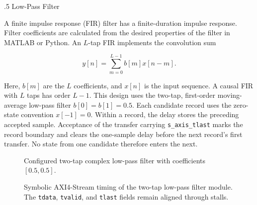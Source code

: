%
%
\smallskip
{}
.5  \quad Low-Pass Filter

A finite impulse response (FIR) filter has a finite-duration impulse response.  Filter coefficients are calculated from the desired properties of the filter in MATLAB or Python.  An $L$-tap FIR implements the convolution sum

\begin{equation*}
y[n]=\sum_{m=0}^{L-1}b[m]x[n-m].
\end{equation*}

Here, $b[m]$ are the $L$ coefficients, and $x[n]$ is the input sequence.  A causal FIR with $L$ taps has order $L-1$.  This design uses the two-tap, first-order moving-average low-pass filter $b[0]=b[1]=0.5$.  Each candidate record uses the zero-state convention $x[-1]=0$.  Within a record, the delay stores the preceding accepted sample.  Acceptance of the transfer carrying \texttt{s\_axis\_tlast} marks the record boundary and clears the one-sample delay before the next record's first transfer.  No state from one candidate therefore enters the next.

\begin{figure}[H]
\begin{center}
\resizebox{\textwidth}{!}{}
\caption{Configured two-tap complex low-pass filter with coefficients $[0.5,0.5]$.}
\label{fig:cfir}
\end{center}
\end{figure}

\begin{figure}[H]
\begin{center}
\resizebox{0.96\textwidth}{!}{}
\caption{Symbolic AXI4-Stream timing of the two-tap low-pass filter module. The \texttt{tdata}, \texttt{tvalid}, and \texttt{tlast} fields remain aligned through stalls.}
\label{fig:3_FIR}
\end{center}
\end{figure}

